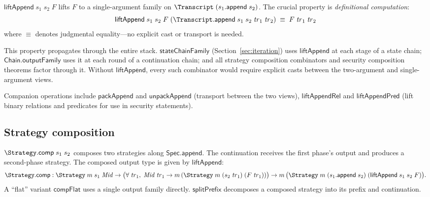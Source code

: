 \begin{definition}
  \label{int:lift-append}
  $\mathsf{liftAppend}\;s_1\;s_2\;F$ lifts $F$ to a single-argument family on
  $\Transcript\;(s_1.\mathsf{append}\;s_2)$.  The crucial property is
  \emph{definitional computation}:
  \[
    \mathsf{liftAppend}\;s_1\;s_2\;F\;
      (\Transcript.\mathsf{append}\;s_1\;s_2\;\mathit{tr}_1\;\mathit{tr}_2)
    \;\equiv\;
    F\;\mathit{tr}_1\;\mathit{tr}_2
  \]
  where $\equiv$ denotes judgmental equality---no explicit cast or transport is
  needed.
\end{definition}

This property propagates through the entire stack. $\mathsf{stateChainFamily}$
(Section~\ref{sec:iteration}) uses $\mathsf{liftAppend}$ at each stage of a
state chain; $\mathsf{Chain.outputFamily}$ uses it at each round of a
continuation chain; and all strategy composition combinators and security
composition theorems factor through it.  Without $\mathsf{liftAppend}$, every
such combinator would require explicit casts between the two-argument and
single-argument views.

Companion operations include $\mathsf{packAppend}$ and
$\mathsf{unpackAppend}$ (transport between the two views),
$\mathsf{liftAppendRel}$ and $\mathsf{liftAppendPred}$ (lift binary
relations and predicates for use in security statements).

\subsection{Strategy composition}

\begin{definition}
  \label{int:strategy-comp}
  $\Strategy.\mathsf{comp}\;s_1\;s_2$ composes two strategies along
  $\mathsf{Spec.append}$.  The continuation receives the first phase's output
  and produces a second-phase strategy.  The composed output type is given by
  $\mathsf{liftAppend}$:
  \[
    \Strategy.\mathsf{comp} :
      \Strategy\;m\;s_1\;\mathit{Mid} \to
      \bigl(\forall\;\mathit{tr}_1,\;
        \mathit{Mid}\;\mathit{tr}_1 \to
        m\,(\Strategy\;m\;(s_2\;\mathit{tr}_1)\;(F\;\mathit{tr}_1))\bigr)
      \to m\,\bigl(\Strategy\;m\;(s_1.\mathsf{append}\;s_2)\;
        (\mathsf{liftAppend}\;s_1\;s_2\;F)\bigr).
  \]
  A ``flat'' variant $\mathsf{compFlat}$ uses a single output family directly.
  $\mathsf{splitPrefix}$ decomposes a composed strategy into its prefix and
  continuation.
\end{definition}

